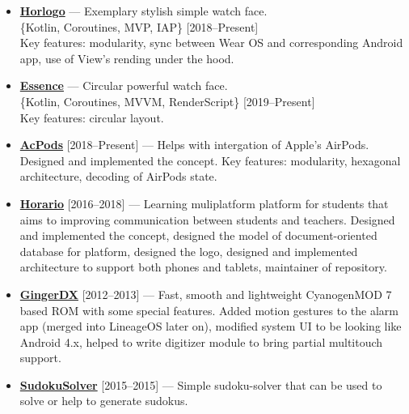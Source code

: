 \documentclass[a4paper]{article}
\begin{document}
\begin{itemize}
		\item \faAndroid \enskip \href{https://github.com/AChep/horlogo}{\textbf{Horlogo}} --- Exemplary stylish simple watch face. \\[0.2em]
		{\footnotesize \{Kotlin, Coroutines, MVP, IAP\} \hfill [2018--Present]} \\[0.2em]
		Key features: modularity, sync between Wear OS and corresponding Android app, use of View's rending under the hood.   
		
		\item \faAndroid \enskip \href{https://play.google.com/store/apps/details?id=com.artemchep.essence}{\textbf{Essence}} --- Circular powerful watch face. \\[0.2em]
		{\footnotesize \{Kotlin, Coroutines, MVVM, RenderScript\} \hfill [2019--Present]} \\[0.2em]
		Key features: circular layout.  
		
		\item {\footnotesize \faAndroid \enskip \href{https://github.com/AChep/acpods}{\textbf{AcPods}} [2018--Present] --- Helps with intergation of Apple's AirPods. Designed and implemented the concept. Key features: modularity, hexagonal architecture, decoding of AirPods state.}   
		
		\item {\footnotesize \faAndroid \enskip \href{http://artemchep.com/horario/}{\textbf{Horario}} [2016--2018] --- Learning muliplatform platform for students that aims to improving communication between students and teachers. Designed and implemented the concept, designed the model of document-oriented database for platform, designed the logo, designed and implemented architecture to support both phones and tablets, maintainer of repository.} 
		
		\item {\footnotesize \faAndroid \enskip \href{https://forum.xda-developers.com/showthread.php?t=1188486}{\textbf{GingerDX}} [2012--2013] --- Fast, smooth and lightweight CyanogenMOD 7 based ROM with some special features. Added motion gestures to the alarm app (merged into LineageOS later on), modified system UI to be looking like Android 4.x, helped to write digitizer module to bring partial multitouch support.}
		
		\item {\footnotesize \href{https://github.com/AChep/SudokuSolver}{\textbf{SudokuSolver}} [2015--2015] --- Simple sudoku-solver that can be used to solve or help to generate sudokus.}
	\end{itemize}
	
\end{document}
